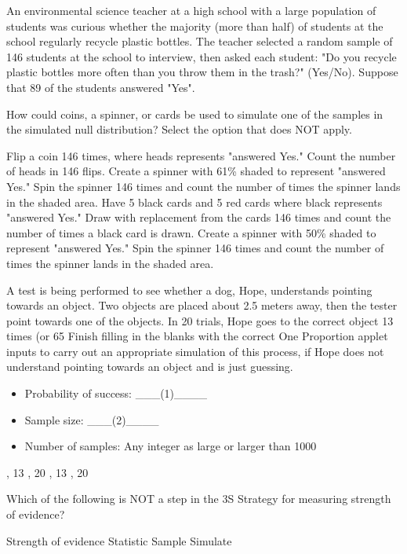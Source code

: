 \documentclass{exam}
\begin{document}
	\begin{questions}
			
		
		\question An environmental science teacher at a high school with a large population of students was curious whether the majority (more than half) of students at the school regularly recycle plastic bottles. The teacher selected a random sample of 146 students at the school to interview, then asked each student: "Do you recycle plastic bottles more often than you throw them in the trash?" (Yes/No). Suppose that 89 of the students answered "Yes".
		
		How could coins, a spinner, or cards be used to simulate one of the samples in the simulated null distribution? Select the option that does NOT apply.
		\begin{choices}
			\choice Flip a coin 146 times, where heads represents "answered Yes." Count the number of heads in 146 flips.
			\correctchoice Create a spinner with 61\% shaded to represent "answered Yes." Spin the spinner 146 times and count the number of times the spinner lands in the shaded area.
			\choice Have 5 black cards and 5 red cards where black represents "answered Yes."  Draw with replacement from the cards 146 times and count the number of times a black card is drawn.
			\choice Create a spinner with 50\% shaded to represent "answered Yes." Spin the spinner 146 times and count the number of times the spinner lands in the shaded area.
		\end{choices}
		
		\question A test is being performed to see whether a dog, Hope, understands pointing towards an object. Two objects are placed about 2.5 meters away, then the tester point towards one of the objects. In 20 trials, Hope goes to the correct object 13 times (or 65%
		Finish filling in the blanks with the correct One Proportion applet inputs to carry out an appropriate simulation of this process, if Hope does not understand pointing towards an object and is just guessing.
		\begin{itemize}
			\item Probability of success: \_\_\_(1)\_\_\_\_
			\item Sample size: \_\_\_(2)\_\_\_\_
			\item Number of samples: Any integer as large or larger than 1000
		\end{itemize}
		\begin{oneparchoices}
			, 13
			, 20
			, 13
			, 20
		\end{oneparchoices}
		
		\question Which of the following is NOT a step in the 3S Strategy for measuring strength of evidence?
		
		\begin{oneparchoices}
			\choice Strength of evidence
			\choice Statistic
			\correctchoice Sample
			\choice Simulate
		\end{oneparchoices}
		
	\end{questions}
\end{document}
